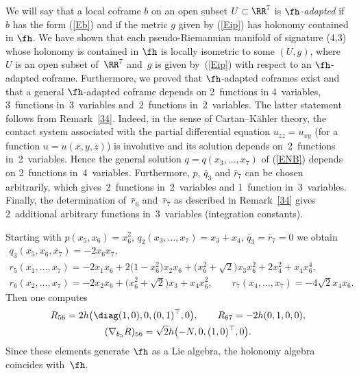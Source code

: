 \begin{Remark} \label{R35} We will say that a local coframe $b$ on an open subset $U\subset \RR^7$ is {\it $\fh$-adapted} if $b$ has the form (\ref{Eb}) and if the metric $g$ given by (\ref{Eip}) has holonomy contained in $\fh$. We have shown that each pseudo-Riemannian manifold of signature (4,3) whose holonomy is contained in $\fh$ is locally isometric to some $(U,g)$, where~$U$ is an open subset of~$\RR^7$ and~$g$ is given by~(\ref{Eip}) with respect to an $\fh$-adapted coframe. Furthermore, we proved that $\fh$-adapted coframes exist and that a general $\fh$-adapted coframe depends on 2~functions in 4~variables, 3~functions in~3~variables and~2~functions in~2~variables. The latter statement follows from Remark~\ref{34}. Indeed, in the sense of Cartan--K\"ahler theory, the contact system associated with the partial differential equation $u_{zz}=u_{xy}$ (for a function $u=u(x,y,z)$) is involutive and its solution depends on~2~functions in~2~variables. Hence the general solution $q=q(x_3,\dots,x_7)$ of (\ref{ENB}) depends on 2~functions in~4~variables. Furthermore, $p$, $\bar q_3$ and $\bar r_7$ can be chosen arbitrarily, which gives~2~functions in~2~variables and 1~function in~3~variables. Finally, the determination of~$\bar r_6$ and~$\bar r_7$ as described in Remark~\ref{34} gives 2~additional arbitrary functions in~3~variables (integration constants).
\end{Remark}

\begin{Example} Starting with $p(x_5,x_6)=x_6^2$, $q_2(x_3,\dots, x_7)=x_3+x_4$, $\bar q_3=\bar r_7=0$ we obtain
\begin{gather*}
q_3(x_5,x_6,x_7) = -2x_6 x_7 ,\\
r_5(x_1,\dots, x_7) = -2x_1 x_6 +2 \big(1-x_6^2\big) x_2 x_6 +\big(x_6^2 +\sqrt2\big)x_3 x_6^2 +2x_4^2 +x_4 x_6^4,\\
r_6(x_2,\dots, x_7) = -2x_2 x_6 +\big(x_6^2 +\sqrt2\big)x_3 +x_4 x_6^2,\qquad
r_7(x_4,\dots, x_7) = -4\sqrt 2x_4 x_6 .
\end{gather*}
Then one computes
\begin{gather*}R_{56}=2h\big(\diag(1,0),0,(0,1)^\top,0\big), \qquad R_{67}=-2h(0,1,0,0), \\ (\nabla_{b_5} R)_{56}=\sqrt2 h\big({-}N,0,(1,0)^\top,0\big).\end{gather*}
Since these elements generate $\fh$ as a Lie algebra, the holonomy algebra coincides with~$\fh$.
\end{Example}

